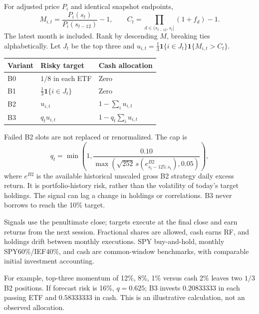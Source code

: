 \documentclass[11pt]{article}
\begin{document}
For adjusted price $P_i$ and identical snapshot endpoints,
\begin{equation}
M_{i,t}=\frac{P_i(s_t)}{P_i(s_{t-12})}-1,\qquad
C_t=\prod_{d\in(s_{t-12},s_t]}(1+f_d)-1.
\end{equation}
The latest month is included. Rank by descending $M$, breaking ties alphabetically. Let $J_t$ be the top three and $u_{i,t}=\frac13\mathbf{1}\{i\in J_t\}\mathbf{1}\{M_{i,t}>C_t\}$.
\begin{center}\begin{tabular}{lll}\toprule
Variant & Risky target & Cash allocation\\\midrule
B0 & $1/8$ in each ETF & Zero\\
B1 & $\frac13\mathbf{1}\{i\in J_t\}$ & Zero\\
B2 & $u_{i,t}$ & $1-\sum_i u_{i,t}$\\
B3 & $q_tu_{i,t}$ & $1-q_t\sum_i u_{i,t}$\\\bottomrule\end{tabular}\end{center}
Failed B2 slots are not replaced or renormalized. The cap is
\begin{equation}
q_t=\min\left(1,\frac{0.10}{\max(\sqrt{252}\,s(e^{B2}_{s_t-125:s_t}),0.05)}\right),
\end{equation}
where $e^{B2}$ is the available historical unscaled gross B2 strategy daily excess return. It is portfolio-history risk, rather than the volatility of today's target holdings. The signal can lag a change in holdings or correlations. B3 never borrows to reach the 10\% target.

Signals use the penultimate close; targets execute at the final close and earn returns from the next session. Fractional shares are allowed, cash earns RF, and holdings drift between monthly executions. SPY buy-and-hold, monthly SPY60\%/IEF40\%, and cash are common-window benchmarks, with comparable initial investment accounting.

For example, top-three momentum of 12\%, 8\%, 1\% versus cash 2\% leaves two $1/3$ B2 positions. If forecast risk is 16\%, $q=0.625$; B3 invests $0.20833333$ in each passing ETF and $0.58333333$ in cash. This is an illustrative calculation, not an observed allocation.
\clearpage
\end{document}

